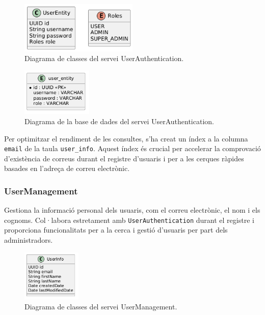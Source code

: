 \begin{figure}[H]
    \centering
    \includegraphics[width=0.5\textwidth]{Figures/diagrama_clases_userAuth.png}
    \caption{Diagrama de classes del servei UserAuthentication.}
    \label{fig:userauth_classes}
\end{figure}

\begin{figure}[H]
    \centering
    \includegraphics[width=0.3\textwidth]{Figures/diagrama_bd_userAuth.png}
    \caption{Diagrama de la base de dades del servei UserAuthentication.}
    \label{fig:userauth_db}
\end{figure}

Per optimitzar el rendiment de les consultes, s'ha creat un índex a la columna \texttt{email} de la taula \texttt{user\_info}. Aquest índex és crucial per accelerar la comprovació d'existència de correus durant el registre d'usuaris i per a les cerques ràpides basades en l'adreça de correu electrònic.

\subsubsection{UserManagement}
Gestiona la informació personal dels usuaris, com el correu electrònic, el nom i els cognoms. Col·labora estretament amb \texttt{UserAuthentication} durant el registre i proporciona funcionalitats per a la cerca i gestió d'usuaris per part dels administradors.

\begin{figure}[H]
    \centering
    \includegraphics[width=0.25\textwidth]{Figures/diagrama_clases_userManagement.png}
    \caption{Diagrama de classes del servei UserManagement.}
    \label{fig:usermgmt_classes}
\end{figure}

